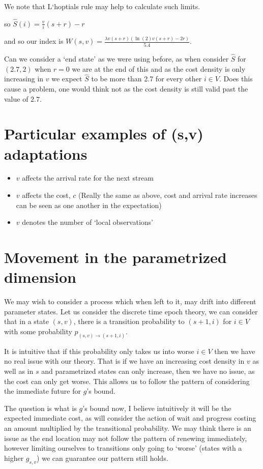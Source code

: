 \documentclass[a4paper,10pt]{article}
\theoremstyle{definition}
\theoremstyle{definition}
\theoremstyle{remark}
\theoremstyle{definition}
\begin{document}
We note that L`hoptials rule may help to calculate such limits. 

so $\hat{S}(i)=\frac{v}{i} (s+r) -r$

and so our index is $W(s,v)=\frac{\lambda v (s+r) (\ln (2) v (s+r) -2r)}{5.4}$.

Can we consider a `end state' as we were using before, as when consider $\hat{S}$ for $(2.7,2)$ when $r=0$ we are at the end of this and as the cost density is only increasing in $v$ we expect $\hat{S}$ to be more than 2.7 for every other $i \in V$. Does this cause a problem, one would think not as the cost density is still valid past the value of $2.7$.

\section{Particular examples of (s,v) adaptations}
\begin{itemize}
\item $v$ affects the arrival rate for the next stream
\item $v$ affects the cost, $c$ (Really the same as above, cost and arrival rate increases can be seen as one another in the expectation)
\item $v$ denotes the number of `local observations'
\end{itemize}

\section{Movement in the parametrized dimension}
We may wish to consider a process which when left to it, may drift into different parameter states. Let us consider the discrete time epoch theory, we can consider that in a state $(s,v)$, there is a transition probability to $(s+1,i)$ for $i \in V$ with some probability $p_{(s,v) \rightarrow (s+1,i)}$.

It is intuitive that if this probability only takes us into worse $i \in V$ then we have no real issue with our theory. That is if we have an increasing cost density in $v$ as well as in $s$ and parametrized states can only increase, then we have no issue, as the cost can only get worse. This allows us to follow the pattern of considering the immediate future for $g$'s bound.

The question is what is $g$'s bound now, I believe intuitively it will be the expected immediate cost, as will consider the action of wait and progress costing an amount multiplied by the transitional probability. We may think there is an issue as the end location may not follow the pattern of renewing immediately, however limiting ourselves to transitions only going to `worse' (states with a higher $g_{s,v}$) we can guarantee our pattern still holds.
\end{document}

